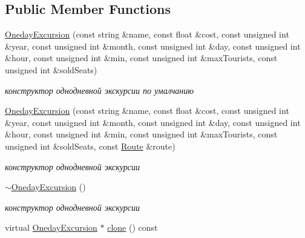 \subsection*{Public Member Functions}
\begin{DoxyCompactItemize}
\item 
\hypertarget{class_oneday_excursion_a1ac2c8f44be8ad9294a0c601d4ec3f21}{}\hyperlink{class_oneday_excursion_a1ac2c8f44be8ad9294a0c601d4ec3f21}{Oneday\+Excursion} (const string \&name, const float \&cost, const unsigned int \&year, const unsigned int \&month, const unsigned int \&day, const unsigned int \&hour, const unsigned int \&min, const unsigned int \&max\+Tourists, const unsigned int \&sold\+Seats)\label{class_oneday_excursion_a1ac2c8f44be8ad9294a0c601d4ec3f21}

\begin{DoxyCompactList}\small\item\em конструктор однодневной экскурсии по умалчанию \end{DoxyCompactList}\item 
\hypertarget{class_oneday_excursion_af0a903573c4e4470fddd3183c2eae30e}{}\hyperlink{class_oneday_excursion_af0a903573c4e4470fddd3183c2eae30e}{Oneday\+Excursion} (const string \&name, const float \&cost, const unsigned int \&year, const unsigned int \&month, const unsigned int \&day, const unsigned int \&hour, const unsigned int \&min, const unsigned int \&max\+Tourists, const unsigned int \&sold\+Seats, const \hyperlink{class_route}{Route} \&route)\label{class_oneday_excursion_af0a903573c4e4470fddd3183c2eae30e}

\begin{DoxyCompactList}\small\item\em конструктор однодневной экскурсии \end{DoxyCompactList}\item 
\hypertarget{class_oneday_excursion_a086bfa348889e493e3a1e32d504f442e}{}\hyperlink{class_oneday_excursion_a086bfa348889e493e3a1e32d504f442e}{$\sim$\+Oneday\+Excursion} ()\label{class_oneday_excursion_a086bfa348889e493e3a1e32d504f442e}

\begin{DoxyCompactList}\small\item\em конструктор однодневной экскурсии \end{DoxyCompactList}\item 
\hypertarget{class_oneday_excursion_ac30696f6a7a717f0252001e8454f7341}{}virtual \hyperlink{class_oneday_excursion}{Oneday\+Excursion} $\ast$ \hyperlink{class_oneday_excursion_ac30696f6a7a717f0252001e8454f7341}{clone} () const \label{class_oneday_excursion_ac30696f6a7a717f0252001e8454f7341}


\end{DoxyCompactItemize}
